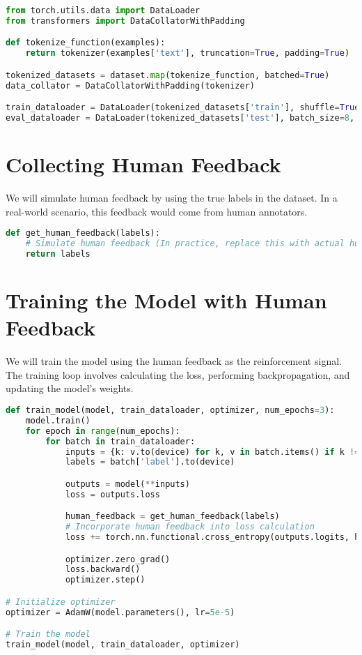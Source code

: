 \begin{lstlisting}[language=python]
from torch.utils.data import DataLoader
from transformers import DataCollatorWithPadding

def tokenize_function(examples):
    return tokenizer(examples['text'], truncation=True, padding=True)

tokenized_datasets = dataset.map(tokenize_function, batched=True)
data_collator = DataCollatorWithPadding(tokenizer)

train_dataloader = DataLoader(tokenized_datasets['train'], shuffle=True, batch_size=8, collate_fn=data_collator)
eval_dataloader = DataLoader(tokenized_datasets['test'], batch_size=8, collate_fn=data_collator)
\end{lstlisting}

\section{Collecting Human Feedback}
We will simulate human feedback by using the true labels in the dataset. In a real-world scenario, this feedback would come from human annotators.

\begin{lstlisting}[language=python]
def get_human_feedback(labels):
    # Simulate human feedback (In practice, replace this with actual human feedback)
    return labels
\end{lstlisting}

\section{Training the Model with Human Feedback}
We will train the model using the human feedback as the reinforcement signal. The training loop involves calculating the loss, performing backpropagation, and updating the model's weights.

\begin{lstlisting}[language=python]
def train_model(model, train_dataloader, optimizer, num_epochs=3):
    model.train()
    for epoch in range(num_epochs):
        for batch in train_dataloader:
            inputs = {k: v.to(device) for k, v in batch.items() if k != 'label'}
            labels = batch['label'].to(device)

            outputs = model(**inputs)
            loss = outputs.loss

            human_feedback = get_human_feedback(labels)
            # Incorporate human feedback into loss calculation
            loss += torch.nn.functional.cross_entropy(outputs.logits, human_feedback)

            optimizer.zero_grad()
            loss.backward()
            optimizer.step()

# Initialize optimizer
optimizer = AdamW(model.parameters(), lr=5e-5)

# Train the model
train_model(model, train_dataloader, optimizer)
\end{lstlisting}

